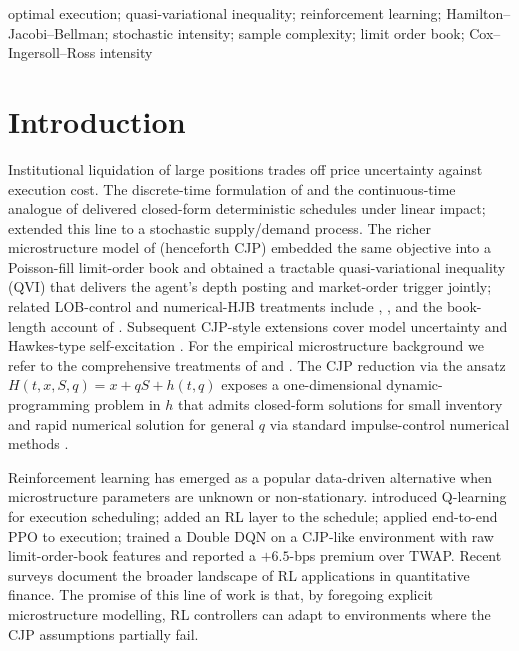 \documentclass[]{interact}
\theoremstyle{plain}
\theoremstyle{definition}
\theoremstyle{remark}
\newcommand{\1}[1]{\mathbf{1}_{\{#1\}}}
\begin{document}
\begin{keywords}
optimal execution; quasi-variational inequality; reinforcement learning;
Hamilton--Jacobi--Bellman; stochastic intensity; sample complexity;
limit order book; Cox--Ingersoll--Ross intensity
\end{keywords}


\section{Introduction}\label{sec:intro}

Institutional liquidation of large positions trades off price uncertainty against execution cost. The discrete-time formulation of \citet{bertsimaslo1998} and the continuous-time analogue of \citet{almgrenchriss2001} delivered closed-form deterministic schedules under linear impact; \citet{obizhaevawang2013} extended this line to a stochastic supply/demand process. The richer microstructure model of \citet{cjp2015} (henceforth CJP) embedded the same objective into a Poisson-fill limit-order book and obtained a tractable quasi-variational inequality (QVI) that delivers the agent's depth posting and market-order trigger jointly; related LOB-control and numerical-HJB treatments include \citet{bayraktarludkovski2014}, \citet{forsyth2011hjb}, and the book-length account of \citet{gueant2016marketliquidity}. Subsequent CJP-style extensions cover model uncertainty \citep{cartea2017uncertainty, cartea2018sigest} and Hawkes-type self-excitation \citep{alfonsi2016hawkes}. For the empirical microstructure background we refer to the comprehensive treatments of \citet{bouchaud2018trades} and \citet{contstoikovtalreja2010}. The CJP reduction via the ansatz $H(t,x,S,q) = x + qS + h(t,q)$ exposes a one-dimensional dynamic-programming problem in $h$ that admits closed-form solutions for small inventory and rapid numerical solution for general $q$ via standard impulse-control numerical methods \citep{pham2009stochastic, forsythvetzal2002}.

Reinforcement learning has emerged as a popular data-driven alternative when microstructure parameters are unknown or non-stationary. \citet{nevmyvaka2006rl} introduced Q-learning for execution scheduling; \citet{hendrickswilcox2014} added an RL layer to the \citet{almgrenchriss2001} schedule; \citet{linbeling2020} applied end-to-end PPO to execution; \citet{ninglinjaimungal2021} trained a Double DQN on a CJP-like environment with raw limit-order-book features and reported a $+6.5$-bps premium over TWAP. Recent surveys \citep{hambly2023rlfinance, charpentier2023rlecon} document the broader landscape of RL applications in quantitative finance. The promise of this line of work is that, by foregoing explicit microstructure modelling, RL controllers can adapt to environments where the CJP assumptions partially fail.
\end{document}
